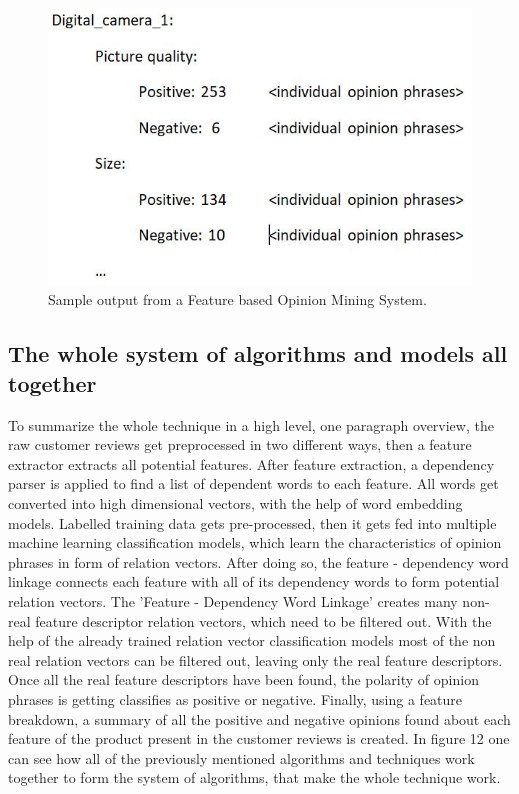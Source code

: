\documentclass{sig-alternate}
\begin{document}
\begin{figure}
\centering
\includegraphics[scale=0.60]{images/fbom_system.JPG}
\caption{Sample output from a Feature based Opinion Mining System.}
\end{figure}

\subsection{The whole system of algorithms and models all together}
To summarize the whole technique in a high level, one paragraph overview, the raw customer reviews get preprocessed in two different ways, then a feature extractor extracts all potential features. After feature extraction, a dependency parser is applied to find a list of dependent words to each feature. All words get converted into high dimensional vectors, with the help of word embedding models. Labelled training data gets pre-processed, then it gets fed into multiple machine learning classification models, which learn the characteristics of opinion phrases in form of relation vectors. After doing so, the feature - dependency word linkage connects each feature with all of its dependency words to form potential relation vectors. The 'Feature - Dependency Word Linkage' creates many non-real feature descriptor relation vectors, which need to be filtered out. With the help of the already trained relation vector classification models most of the non real relation vectors can be filtered out, leaving only the real feature descriptors.  Once all the real feature descriptors have been found, the polarity of opinion phrases is getting classifies as positive or negative. Finally, using a feature breakdown, a summary of all the positive and negative opinions found about each feature of the product present in the customer reviews is created.
In figure 12 one can see how all of the previously mentioned algorithms and techniques work together to form the system of algorithms, that make the whole technique work.
\end{document}
